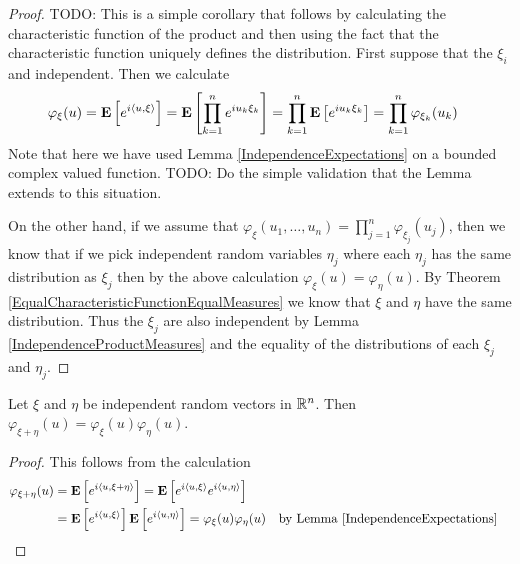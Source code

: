 \begin{proof}
TODO: This is a simple corollary that follows by calculating the
characteristic function of the product and then using the fact that
the characteristic function uniquely defines the distribution.
First suppose that the $\xi_i$ and independent.  Then we calculate
\begin{align*}
\varphi_\xi(u) &= \textbf{E}\left[e^{i\langle u, \xi
    \rangle}\right] = \textbf{E}\left[\prod_{k=1}^ne^{i u_k \xi_k}\right]
=\prod_{k=1}^n \textbf{E}\left[e^{i u_k \xi_k}\right] = \prod_{k=1}^n \varphi_{\xi_k}(u_k) 
\end{align*}
Note that here we have used Lemma \ref{IndependenceExpectations} on
a bounded complex valued function.
TODO: Do the simple validation that the Lemma extends to this situation.

On the other hand, if we assume that $\varphi_\xi(u_1, \ldots , u_n) =
\prod_{j=1}^n \varphi_{\xi_j}(u_j)$, then we know that if we pick
independent random variables $\eta_j$ where each $\eta_j$ has the same
distribution as $\xi_j$ then by the above calculation $\varphi_\xi(u)
= \varphi_\eta(u)$.
By Theorem \ref{EqualCharacteristicFunctionEqualMeasures} we know
that $\xi$ and $\eta$ have the same distribution.  Thus the $\xi_j$
are also independent by Lemma \ref{IndependenceProductMeasures} and
the equality of the distributions of each $\xi_j$ and $\eta_j$.
\end{proof}
\begin{lem}Let $\xi$ and $\eta$ be independent random vectors in
  $\mathbb{R}^n$.  Then $\varphi_{\xi + \eta}(u) = \varphi_\xi(u) \varphi_\eta(u)$.
\end{lem}
\begin{proof}
This follows from the calculation 
\begin{align*}
\varphi_{\xi + \eta}(u) &= \textbf{E}\left[e^{i\langle u, \xi + \eta
    \rangle}\right] = \textbf{E}\left[e^{i\langle u, \xi
    \rangle}e^{i\langle u, \eta \rangle}\right] \\
&=\textbf{E}\left[e^{i\langle u, \xi
    \rangle}\right] \textbf{E}\left[e^{i\langle u, \eta \rangle}\right] =
\varphi_{\xi }(u)\varphi_{\eta}(u)& & \text{by
  Lemma \ref{IndependenceExpectations}}
\end{align*}
\end{proof}

